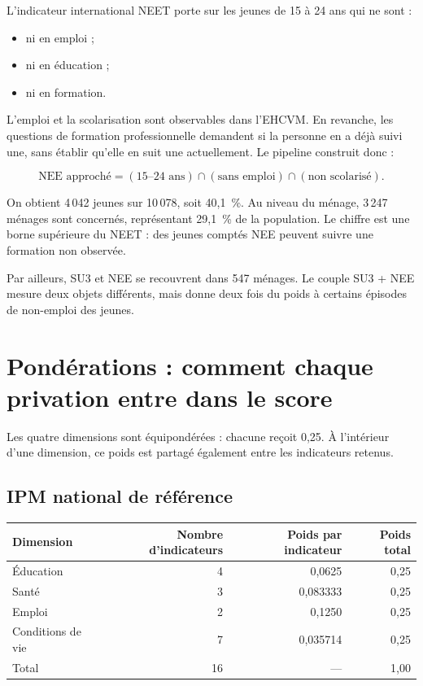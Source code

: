\documentclass[11pt,a4paper]{article}
\begin{document}
L'indicateur international NEET porte sur les jeunes de 15 à 24 ans qui ne sont :

\begin{itemize}
  \item ni en emploi ;
  \item ni en éducation ;
  \item ni en formation.
\end{itemize}

L'emploi et la scolarisation sont observables dans l'EHCVM. En revanche, les questions de
formation professionnelle demandent si la personne en a déjà suivi une, sans établir qu'elle en
suit une actuellement. Le pipeline construit donc :

\[
  \text{NEE approché} = (15\text{--}24\text{ ans}) \cap
  (\text{sans emploi}) \cap (\text{non scolarisé}).
\]

On obtient 4\,042 jeunes sur 10\,078, soit 40,1~\%. Au niveau du ménage, 3\,247 ménages sont
concernés, représentant 29,1~\% de la population. Le chiffre est une borne supérieure du NEET :
des jeunes comptés NEE peuvent suivre une formation non observée.

Par ailleurs, SU3 et NEE se recouvrent dans 547 ménages. Le couple SU3 + NEE mesure deux objets
différents, mais donne deux fois du poids à certains épisodes de non-emploi des jeunes.

\section{Pondérations : comment chaque privation entre dans le score}

Les quatre dimensions sont équipondérées : chacune reçoit 0,25. À l'intérieur d'une dimension,
ce poids est partagé également entre les indicateurs retenus.

\subsection{IPM national de référence}

\begin{center}
\small
\begin{tabular}{@{}lrrr@{}}
\toprule
\textbf{Dimension} & \textbf{Nombre d'indicateurs} & \textbf{Poids par indicateur} &
\textbf{Poids total} \\
\midrule
Éducation & 4 & 0,0625 & 0,25 \\
Santé & 3 & 0,083333 & 0,25 \\
Emploi & 2 & 0,1250 & 0,25 \\
Conditions de vie & 7 & 0,035714 & 0,25 \\
\midrule
Total & 16 & --- & 1,00 \\
\bottomrule
\end{tabular}
\end{center}
\end{document}
